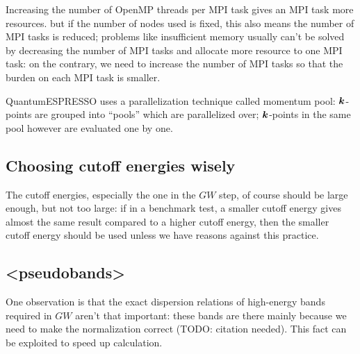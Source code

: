 \documentclass[hyperref, a4paper, 12pt]{report}
\def\texttt#1{<#1>}%
\newcommand{\shortcode}[1]{\texttt{#1}}
\begin{document}
Increasing the number of OpenMP threads per MPI task 
gives an MPI task more resources. 
but if the number of nodes used is fixed, 
this also means the number of MPI tasks is reduced; 
problems like insufficient memory 
usually can't be solved by decreasing the number of MPI tasks 
and allocate more resource to one MPI task: 
on the contrary, we need to increase the number of MPI tasks 
so that the burden on each MPI task is smaller.

QuantumESPRESSO uses a parallelization technique called momentum pool: 
$\vb*{k}$-points are grouped into ``pools''
which are parallelized over; 
$\vb*{k}$-points in the same pool however are evaluated one by one.

\subsection{Choosing cutoff energies wisely}

The cutoff energies, especially the one in the $GW$ step,
of course should be large enough, but not too large:
if in a benchmark test, 
a smaller cutoff energy gives almost the same result 
compared to a higher cutoff energy,
then the smaller cutoff energy should be used 
unless we have reasons against this practice.

\subsection{\shortcode{pseudobands}}

One observation is that the exact dispersion relations of high-energy bands required in $GW$ 
aren't that important:
these bands are there mainly because 
we need to make the normalization correct
(TODO: citation needed).
This fact can be exploited to speed up calculation.
\end{document}
